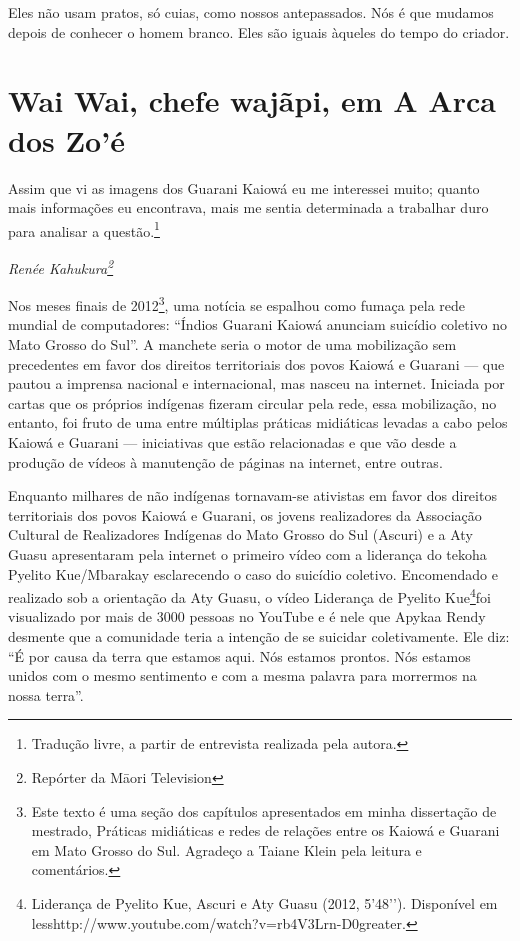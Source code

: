 Eles não usam pratos, só cuias, como nossos antepassados. Nós é que
mudamos depois de conhecer o homem branco. Eles são iguais àqueles do
tempo do criador.

\section{Wai Wai, chefe wajãpi, em A Arca dos Zo’é}

Assim que vi as imagens dos Guarani Kaiowá eu me interessei muito;
quanto mais informações eu encontrava, mais me sentia determinada a
trabalhar duro para analisar a questão.\footnote{Tradução livre, a
partir de entrevista realizada pela autora.}

\begin{flushright}
\emph{Renée Kahukura\footnote{Repórter da M\=aori Television}}
\end{flushright}

Nos meses finais de 2012\footnote{Este texto é uma seção dos capítulos
apresentados em minha dissertação de mestrado, Práticas midiáticas e
redes de relações entre os Kaiowá e Guarani em Mato Grosso do Sul.
Agradeço a Taiane Klein pela leitura e comentários.}, uma notícia se
espalhou como fumaça pela rede mundial de computadores: ``Índios Guarani
Kaiowá anunciam suicídio coletivo no Mato Grosso do Sul''. A manchete
seria o motor de uma mobilização sem precedentes em favor dos direitos
territoriais dos povos Kaiowá e Guarani --- que pautou a imprensa
nacional e internacional, mas nasceu na internet. Iniciada por cartas
que os próprios indígenas fizeram circular pela rede, essa mobilização,
no entanto, foi fruto de uma entre múltiplas práticas midiáticas
levadas a cabo pelos Kaiowá e Guarani --- iniciativas que estão
relacionadas e que vão desde a produção de vídeos à manutenção de
páginas na internet, entre outras. 

Enquanto milhares de não indígenas tornavam-se ativistas em favor dos
direitos territoriais dos povos Kaiowá e Guarani, os jovens
realizadores da Associação Cultural de Realizadores Indígenas do Mato
Grosso do Sul (Ascuri) e a Aty Guasu apresentaram pela internet o
primeiro vídeo com a liderança do tekoha Pyelito Kue/Mbarakay
esclarecendo o caso do suicídio coletivo. Encomendado e realizado sob a
orientação da Aty Guasu, o vídeo Liderança de Pyelito
Kue\footnote{Liderança de Pyelito Kue, Ascuri e Aty Guasu (2012,
5’48’’). Disponível em
{less}http://www.youtube.com/watch?v=rb4V3Lrn-D0{greater}.}foi
visualizado por mais de 3000 pessoas no YouTube e é nele que Apykaa
Rendy desmente que a comunidade teria a intenção de se suicidar
coletivamente. Ele diz: ``É por causa da terra que estamos aqui. Nós
estamos prontos. Nós estamos unidos com o mesmo sentimento e com a
mesma palavra para morrermos na nossa terra''.

